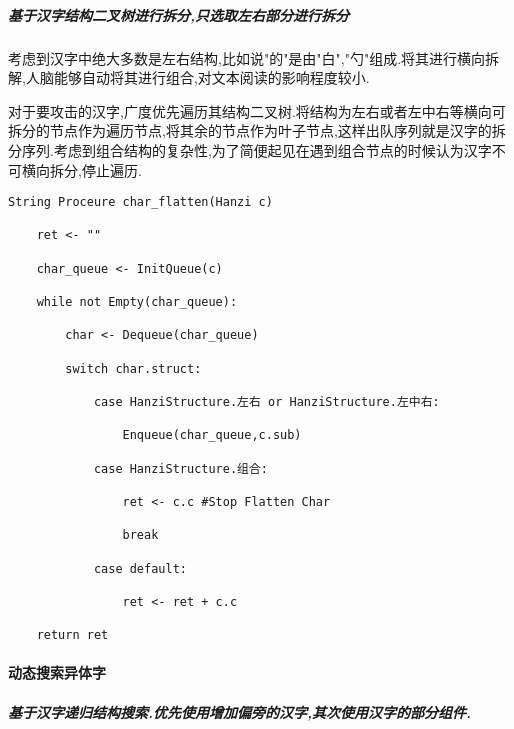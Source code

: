 \documentclass[
]{article}
\begin{document}
\hypertarget{ux57faux4e8eux6c49ux5b57ux7ed3ux6784ux4e8cux53c9ux6811ux8fdbux884cux62c6ux5206ux53eaux9009ux53d6ux5de6ux53f3ux90e8ux5206ux8fdbux884cux62c6ux5206}{%
\subparagraph{基于汉字结构二叉树进行拆分,只选取左右部分进行拆分}\label{ux57faux4e8eux6c49ux5b57ux7ed3ux6784ux4e8cux53c9ux6811ux8fdbux884cux62c6ux5206ux53eaux9009ux53d6ux5de6ux53f3ux90e8ux5206ux8fdbux884cux62c6ux5206}}

考虑到汉字中绝大多数是左右结构,比如说"的"是由"白","勺"组成.将其进行横向拆解,人脑能够自动将其进行组合,对文本阅读的影响程度较小.

对于要攻击的汉字,广度优先遍历其结构二叉树.将结构为左右或者左中右等横向可拆分的节点作为遍历节点,将其余的节点作为叶子节点,这样出队序列就是汉字的拆分序列.考虑到组合结构的复杂性,为了简便起见在遇到组合节点的时候认为汉字不可横向拆分,停止遍历.

\begin{verbatim}
String Proceure char_flatten(Hanzi c)

	ret <- ""

	char_queue <- InitQueue(c)

	while not Empty(char_queue):

		char <- Dequeue(char_queue)

		switch char.struct:

			case HanziStructure.左右 or HanziStructure.左中右:

				Enqueue(char_queue,c.sub)

			case HanziStructure.组合:

				ret <- c.c #Stop Flatten Char

				break

			case default:

				ret <- ret + c.c

	return ret
\end{verbatim}

\hypertarget{ux52a8ux6001ux641cux7d22ux5f02ux4f53ux5b57}{%
\paragraph{动态搜索异体字}\label{ux52a8ux6001ux641cux7d22ux5f02ux4f53ux5b57}}

\hypertarget{ux57faux4e8eux6c49ux5b57ux9012ux5f52ux7ed3ux6784ux641cux7d22ux4f18ux5148ux4f7fux7528ux589eux52a0ux504fux65c1ux7684ux6c49ux5b57ux5176ux6b21ux4f7fux7528ux6c49ux5b57ux7684ux90e8ux5206ux7ec4ux4ef6}{%
\subparagraph{基于汉字递归结构搜索.优先使用增加偏旁的汉字,其次使用汉字的部分组件.}\label{ux57faux4e8eux6c49ux5b57ux9012ux5f52ux7ed3ux6784ux641cux7d22ux4f18ux5148ux4f7fux7528ux589eux52a0ux504fux65c1ux7684ux6c49ux5b57ux5176ux6b21ux4f7fux7528ux6c49ux5b57ux7684ux90e8ux5206ux7ec4ux4ef6}}
\end{document}
